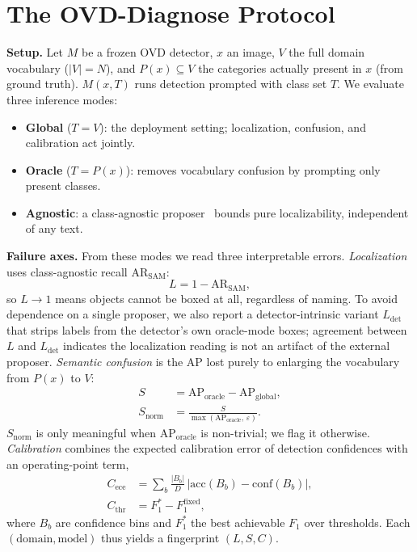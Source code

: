 \documentclass[10pt,twocolumn,letterpaper]{article}
\begin{document}
\section{The OVD-Diagnose Protocol}
\label{sec:method}
\textbf{Setup.} Let $M$ be a frozen OVD detector, $x$ an image, $V$ the full domain
vocabulary ($|V|{=}N$), and $P(x)\subseteq V$ the categories actually present in $x$
(from ground truth). $M(x,T)$ runs detection prompted with class set $T$. We evaluate three
inference modes:
\begin{itemize}
  \item \textbf{Global} ($T{=}V$): the deployment setting; localization, confusion, and
  calibration act jointly.
  \item \textbf{Oracle} ($T{=}P(x)$): removes vocabulary confusion by prompting only
  present classes.
  \item \textbf{Agnostic}: a class-agnostic proposer~\cite{kirillov2023sam} bounds pure
  localizability, independent of any text.
\end{itemize}

\textbf{Failure axes.} From these modes we read three interpretable errors.
\emph{Localization} uses class-agnostic recall $\mathrm{AR}_{\mathrm{SAM}}$:
\begin{equation}
  L = 1 - \mathrm{AR}_{\mathrm{SAM}},
  \label{eq:L}
\end{equation}
so $L{\to}1$ means objects cannot be boxed at all, regardless of naming. To avoid dependence
on a single proposer, we also report a detector-intrinsic variant $L_{\mathrm{det}}$ that
strips labels from the detector's own oracle-mode boxes; agreement between $L$ and
$L_{\mathrm{det}}$ indicates the localization reading is not an artifact of the external
proposer.
\emph{Semantic confusion} is the AP lost purely to enlarging the vocabulary from $P(x)$ to
$V$:
\begin{equation}
  \begin{aligned}
    S &= \mathrm{AP}_{\mathrm{oracle}} - \mathrm{AP}_{\mathrm{global}}, \\
    S_{\mathrm{norm}} &= \frac{S}{\max(\mathrm{AP}_{\mathrm{oracle}},\,\varepsilon)}.
  \end{aligned}
  \label{eq:S}
\end{equation}
$S_{\mathrm{norm}}$ is only meaningful when $\mathrm{AP}_{\mathrm{oracle}}$ is non-trivial;
we flag it otherwise. \emph{Calibration} combines the expected calibration error of detection
confidences with an operating-point term,
\begin{equation}
  \begin{aligned}
    C_{\mathrm{ece}} &= \sum_b \tfrac{|B_b|}{D}\,
      \bigl|\mathrm{acc}(B_b)-\mathrm{conf}(B_b)\bigr|, \\
    C_{\mathrm{thr}} &= F_1^{*} - F_1^{\mathrm{fixed}},
  \end{aligned}
  \label{eq:C}
\end{equation}
where $B_b$ are confidence bins and $F_1^{*}$ the best achievable $F_1$ over thresholds.
Each $(\text{domain},\text{model})$ thus yields a fingerprint $(L, S, C)$.
\end{document}
